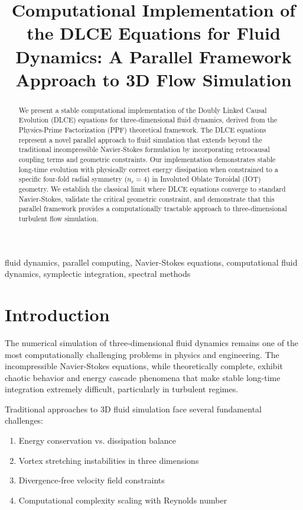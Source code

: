 \documentclass[conference]{IEEEtran}
\begin{document}
\title{Computational Implementation of the DLCE Equations for Fluid Dynamics: A Parallel Framework Approach to 3D Flow Simulation}

\author{
}

\maketitle

\begin{abstract}
We present a stable computational implementation of the Doubly Linked Causal Evolution (DLCE) equations for three-dimensional fluid dynamics, derived from the Physics-Prime Factorization (PPF) theoretical framework. The DLCE equations represent a novel parallel approach to fluid simulation that extends beyond the traditional incompressible Navier-Stokes formulation by incorporating retrocausal coupling terms and geometric constraints. Our implementation demonstrates stable long-time evolution with physically correct energy dissipation when constrained to a specific four-fold radial symmetry ($n_r=4$) in Involuted Oblate Toroidal (IOT) geometry. We establish the classical limit where DLCE equations converge to standard Navier-Stokes, validate the critical geometric constraint, and demonstrate that this parallel framework provides a computationally tractable approach to three-dimensional turbulent flow simulation.
\end{abstract}

\begin{IEEEkeywords}
fluid dynamics, parallel computing, Navier-Stokes equations, computational fluid dynamics, symplectic integration, spectral methods
\end{IEEEkeywords}

\section{Introduction}

The numerical simulation of three-dimensional fluid dynamics remains one of the most computationally challenging problems in physics and engineering. The incompressible Navier-Stokes equations, while theoretically complete, exhibit chaotic behavior and energy cascade phenomena that make stable long-time integration extremely difficult, particularly in turbulent regimes.

Traditional approaches to 3D fluid simulation face several fundamental challenges:
\begin{enumerate}
\item Energy conservation vs. dissipation balance
\item Vortex stretching instabilities in three dimensions  
\item Divergence-free velocity field constraints
\item Computational complexity scaling with Reynolds number
\end{enumerate}
\end{document}

